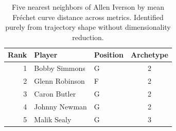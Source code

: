 \begin{table}[htbp]
  \centering\small
  \begin{tabular}{rllc}
    \toprule
    Rank & Player & Position & Archetype \\
    \midrule
    1 & Bobby Simmons & G & 2 \\
    2 & Glenn Robinson & F & 2 \\
    3 & Caron Butler & G & 2 \\
    4 & Johnny Newman & G & 2 \\
    5 & Malik Sealy & G & 3 \\
    \bottomrule
  \end{tabular}
  \caption{Five nearest neighbors of Allen Iverson by mean Fr\'{e}chet curve distance across metrics. Identified purely from trajectory shape without dimensionality reduction.}
  \label{tab:Allen_Iverson_frechet_curve_neighbors}
\end{table}

